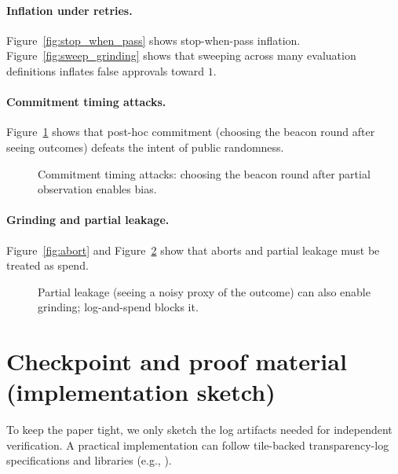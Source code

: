 \documentclass[11pt]{article}
\begin{document}
\paragraph{Inflation under retries.}
Figure~\ref{fig:stop_when_pass} shows stop-when-pass inflation.
Figure~\ref{fig:sweep_grinding} shows that sweeping across many evaluation definitions inflates false approvals toward $1$.

\paragraph{Commitment timing attacks.}
Figure~\ref{fig:commit_timing} shows that post-hoc commitment (choosing the beacon round after seeing outcomes) defeats the intent of public randomness.

\begin{figure}[t]
\centering
{}
\caption{Commitment timing attacks: choosing the beacon round after partial observation enables bias.}
\label{fig:commit_timing}
\end{figure}

\paragraph{Grinding and partial leakage.}
Figure~\ref{fig:abort} and Figure~\ref{fig:partial_leak} show that aborts and partial leakage must be treated as spend.

\begin{figure}[t]
\centering
{}
\caption{Partial leakage (seeing a noisy proxy of the outcome) can also enable grinding; log-and-spend blocks it.}
\label{fig:partial_leak}
\end{figure}

\appendix
\section{Checkpoint and proof material (implementation sketch)}
To keep the paper tight, we only sketch the log artifacts needed for independent verification.
A practical implementation can follow tile-backed transparency-log specifications and libraries (e.g., \cite{c2sp_tlog_checkpoint,c2sp_tlog_tiles,c2sp_tlog_proof,c2sp_tlog_witness,tessera_github}).
\end{document}
